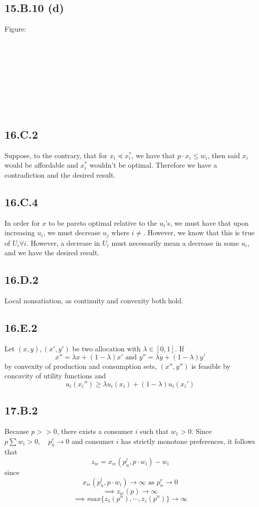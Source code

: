 \documentclass[letterpaper,12pt]{article}
\theoremstyle{definition}
\begin{document}
\subsection*{15.B.10 (d)}
Figure:
\\\\\\\\\\\\\\\\\\

\subsection*{16.C.2}
Suppose, to the contrary, that for $x_i \preceq x_i^*$, we have that $p \cdot x_i \leq w_i$, then said $x_i$ would be affordable and $x_i^*$ wouldn't be optimal. Therefore we have a contradiction and the desired result. 

\subsection*{16.C.4}
In order for $x$ to be pareto optimal relative to the $u_i$'s, we must have that upon increasing $u_i$, we must decrease $u_j$ where $i \neq $. However, we know that this is true of $U_i \forall i$. However, a decrease in $U_i$ must necessarily mean a decrease in some $u_i$, and we have the desired result.

\subsection*{16.D.2}
Local nonsatiation, as continuity and convexity both hold.




\subsection*{16.E.2}
Let $(x,y), (x',y')$ be two allocation with $\lambda \in [0,1]$. If
\[ x'' = \lambda x + ( 1-\lambda ) x' \text{ and } y'' = \lambda y + ( 1-\lambda ) y' \]
by convexity of production and consumption sets, $(x'', y'')$ is feasible by concavity of utility functions and 
\[ u_i(x_i'') \geq \lambda u_i(x_i) + (1- \lambda) u_i(x_i') \]


\subsection*{17.B.2}
Because $p >> 0$, there exists a consumer $i$ such that $w_1 > 0$. Since $p  \sum^{}_{} w_i > 0, \quad p_n^e \to 0$ and consumer $i$ has strictly monotone preferences, it follows that 
\[z_{ie}= x_{ie}(p^l_n, p \cdot w_i) - w_i\]
since \[x_{ie}(p_n^l, p \cdot w_i) \to \infty \text{ as } p_n^e \to 0\]
\[\implies z_{ie}(p) \to \infty\]
\[\implies max \{z_1(p^n), \cdots,z_z(p^n) \} \to \infty \]
\end{document}
